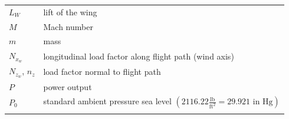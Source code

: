 \documentclass[
]{book}
\begin{document}
\begin{longtable}[]{@{}ll@{}}
\begin{minipage}[t]{0.14\columnwidth}\raggedright
\(L_W\)\strut
\end{minipage} & \begin{minipage}[t]{0.80\columnwidth}\raggedright
lift of the wing\strut
\end{minipage}\tabularnewline
\begin{minipage}[t]{0.14\columnwidth}\raggedright
\(M\)\strut
\end{minipage} & \begin{minipage}[t]{0.80\columnwidth}\raggedright
Mach number\strut
\end{minipage}\tabularnewline
\begin{minipage}[t]{0.14\columnwidth}\raggedright
\(m\)\strut
\end{minipage} & \begin{minipage}[t]{0.80\columnwidth}\raggedright
mass\strut
\end{minipage}\tabularnewline
\begin{minipage}[t]{0.14\columnwidth}\raggedright
\(N_{x_w}\)\strut
\end{minipage} & \begin{minipage}[t]{0.80\columnwidth}\raggedright
longitudinal load factor along flight path (wind axis)\strut
\end{minipage}\tabularnewline
\begin{minipage}[t]{0.14\columnwidth}\raggedright
\(N_{z_w}\), \(n_z\)\strut
\end{minipage} & \begin{minipage}[t]{0.80\columnwidth}\raggedright
load factor normal to flight path\strut
\end{minipage}\tabularnewline
\begin{minipage}[t]{0.14\columnwidth}\raggedright
\(P\)\strut
\end{minipage} & \begin{minipage}[t]{0.80\columnwidth}\raggedright
power output\strut
\end{minipage}\tabularnewline
\begin{minipage}[t]{0.14\columnwidth}\raggedright
\(P_0\)\strut
\end{minipage} & \begin{minipage}[t]{0.80\columnwidth}\raggedright
standard ambient pressure sea level \(\left( 2116.22 \frac{\text{lb}}{\text{ft}^2} = 29.921 \text{ in Hg} \right)\)\strut
\end{minipage}\tabularnewline
\begin{minipage}[t]{0.14\columnwidth}\raggedright

\end{minipage}
\end{longtable}
\end{document}
